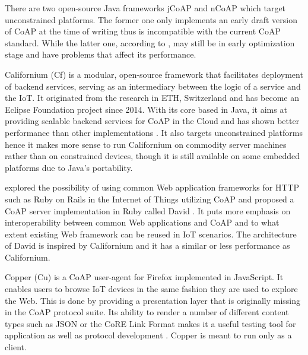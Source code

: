 There are two open-source Java frameworks jCoAP \autocite{jcoap} and nCoAP \autocite{ncoap} which target unconstrained platforms. The former one only implements an early draft version of CoAP at the time of writing thus is incompatible with the current CoAP standard. While the latter one, according to \autocite{lanter2013scalability}, may still be in early optimization stage and have problems that affect its performance.

Californium (Cf) \autocite{californium} is a modular, open-source framework that facilitates deployment of backend services, serving as an intermediary between the logic of a service and the IoT. It originated from the research in ETH, Switzerland and has become an Eclipse Foundation project since 2014. With its core based in Java, it aims at providing scalable backend services for CoAP in the Cloud and has shown better performance than other implementations \autocite{lanter2013scalability, kovatsch2014californium, kovatsch2015scalable}. It also targets unconstrained platforms hence it makes more sense to run Californium on commodity server machines rather than on constrained devices, though it is still available on some embedded platforms due to Java's portability. 

\textcite{muller2015coap} explored the possibility of using common Web application frameworks for HTTP such as Ruby on Rails in the Internet of Things utilizing CoAP and proposed a CoAP server implementation in Ruby called David \autocite{david}. It puts more emphasis on interoperability between common Web applications and CoAP and to what extent existing Web framework can be reused in IoT scenarios. The architecture of David is inspired by Californium and it has a similar or less performance as Californium. 
 
Copper (Cu) \autocite{copper} is a CoAP user-agent for Firefox implemented in JavaScript. It enables users to browse IoT devices in the same fashion they are used to explore the Web. This is done by providing a presentation layer that is originally missing in the CoAP protocol suite. Its ability to render a number of different content types such as JSON or the CoRE Link Format \autocite{core_link} makes it a useful testing tool for application as well as protocol development \autocite{jucker2012securing}. Copper is meant to run only as a client.


